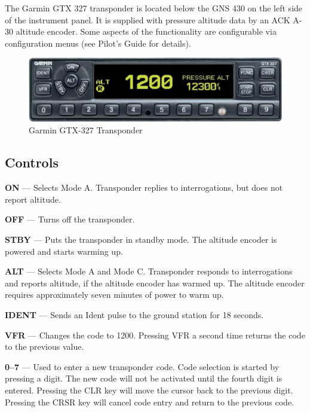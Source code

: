 The Garmin GTX 327 transponder is located below the GNS 430 on the left side of the instrument panel. It is supplied with pressure altitude data by an ACK A-30 altitude encoder. Some aspects of the functionality are configurable via configuration menus (see Pilot's Guide for details).
\begin{figure}
[htb] 
\begin{center}
\includegraphics[scale=0.8]{../Diagrams/GTX327}
\end{center}
\caption{Garmin GTX-327 Transponder} 
\end{figure}

\subsection*{Controls}

\textbf{ON} --- Selects Mode A. Transponder replies to interrogations, but does not report altitude.

\textbf{OFF} --- Turns off the transponder.

\textbf{STBY} --- Puts the transponder in standby mode. The altitude encoder is powered and starts warming up. 

\textbf{ALT} --- Selects Mode A and Mode C. Transponder responds to interrogations and reports altitude, if the altitude encoder has warmed up. The altitude encoder requires approximately seven minutes of power to warm up. 

\textbf{IDENT} --- Sends an Ident pulse to the ground station for 18 seconds.

\textbf{VFR} --- Changes the code to 1200. Pressing VFR a second time returns the code to the previous value.

\textbf{0--7} --- Used to enter a new transponder code. Code selection is started by pressing a digit. The new code will not be activated until the fourth digit is entered. Pressing the CLR key will move the cursor back to the previous digit. Pressing the CRSR key will cancel code entry and return to the previous code.

